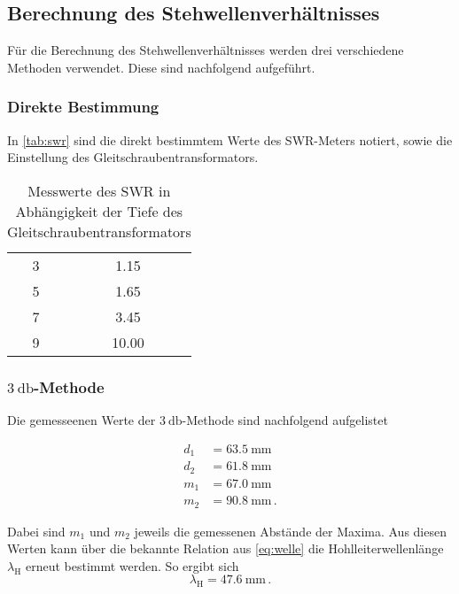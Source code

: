 \subsection{Berechnung des Stehwellenverhältnisses}
\label{ssec:a4}

Für die Berechnung des Stehwellenverhältnisses werden drei verschiedene Methoden verwendet.
Diese sind nachfolgend aufgeführt.

\subsubsection{Direkte Bestimmung}
\label{sssec:a5}

In \autoref{tab:swr} sind die direkt bestimmtem Werte des SWR-Meters notiert, sowie die Einstellung des Gleitschraubentransformators.

\begin{table}
    \centering
    \caption{Messwerte des SWR in Abhängigkeit der Tiefe des Gleitschraubentransformators}
    \label{tab:swr}
    \begin{tabular}{S[table-format=1.0] S[table-format=2.2]}
        \toprule
         &  \\
         & 1.15 \\
        5 & 1.65 \\
        7 & 3.45 \\
        9 & 10.00 \\
        \bottomrule
    \end{tabular}
\end{table}

\subsubsection{\texorpdfstring{$\SI{3}{\decibel}$}{3dB}-Methode}
\label{sssec:a6}

Die gemesseenen Werte der $\SI{3}{\decibel}$-Methode sind nachfolgend aufgelistet

\begin{align*}
    d_1 &= \SI{63.5}{\milli\meter} \\
    d_2 &= \SI{61.8}{\milli\meter} \\
    m_1 &= \SI{67.0}{\milli\meter} \\
    m_2 &= \SI{90.8}{\milli\meter} \, .
\end{align*}

Dabei sind $m_1$ und $m_2$ jeweils die gemessenen Abstände der Maxima.
Aus diesen Werten kann über die bekannte Relation aus \autoref{eq:welle} die Hohlleiterwellenlänge $\lambda _\text{H}$ erneut bestimmt werden.
So ergibt sich 
\begin{equation*}
    \lambda _\text{H} = \SI{47.6}{\milli\meter} \, .
\end{equation*}

